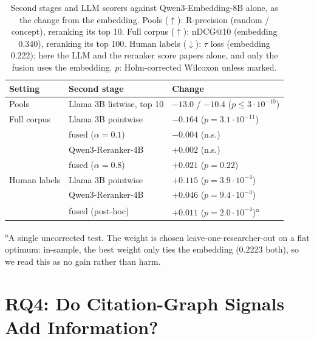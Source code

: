 \documentclass[sigconf,nonacm]{acmart}
\begin{document}
\begin{table}[t]
  \caption{Second stages and LLM scorers against Qwen3-Embedding-8B alone, as the change from the embedding. Pools ($\uparrow$): R-precision (random / concept), reranking its top 10. Full corpus ($\uparrow$): nDCG@10 (embedding 0.340), reranking its top 100. Human labels ($\downarrow$): $\tau$ loss (embedding 0.222); here the LLM and the reranker score papers alone, and only the fusion uses the embedding. $p$: Holm-corrected Wilcoxon unless marked.}
  \label{tab:rerank}
  \small
  \begin{tabular}{@{}lll@{}}
    \toprule
    Setting & Second stage & Change \\
    \midrule
    Pools & Llama 3B listwise, top 10 & $-13.0$ / $-10.4$ ($p \le 3 \cdot 10^{-10}$) \\
    \midrule
    Full corpus & Llama 3B pointwise & $-0.164$ ($p = 3.1 \cdot 10^{-11}$) \\
     & \quad fused ($\alpha = 0.1$) & $-0.004$ (n.s.) \\
     & Qwen3-Reranker-4B & $+0.002$ (n.s.) \\
     & \quad fused ($\alpha = 0.8$) & $+0.021$ ($p = 0.22$) \\
    \midrule
    Human labels & Llama 3B pointwise & $+0.115$ ($p = 3.9 \cdot 10^{-4}$) \\
     & Qwen3-Reranker-4B & $+0.046$ ($p = 9.4 \cdot 10^{-3}$) \\
     & \quad fused (post-hoc) & $+0.011$ ($p = 2.0 \cdot 10^{-4}$)\textsuperscript{a} \\
    \bottomrule
  \end{tabular}
  \par\smallskip\footnotesize\textsuperscript{a}A single uncorrected test. The weight is chosen leave-one-researcher-out on a flat optimum: in-sample, the best weight only ties the embedding (0.2223 both), so we read this as no gain rather than harm.
\end{table}

\section{RQ4: Do Citation-Graph Signals Add Information?}
\label{sec:rq4}
\end{document}
